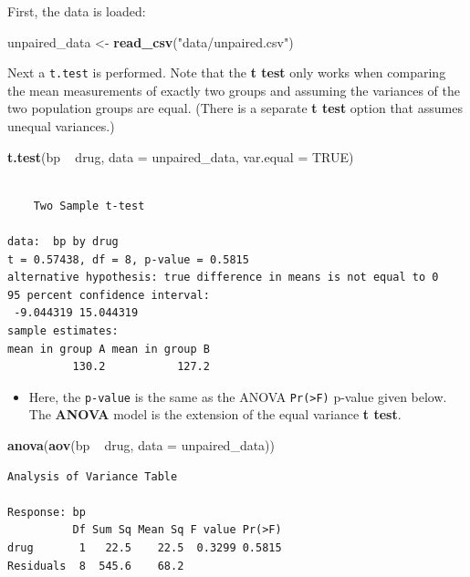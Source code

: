 \documentclass[twoside, 12pt]{article}
\newenvironment{Shaded}{\begin{snugshade}}{\end{snugshade}}
\newcommand{\KeywordTok}[1]{\textcolor[rgb]{0.13,0.29,0.53}{\textbf{{#1}}}}
\newcommand{\DataTypeTok}[1]{\textcolor[rgb]{0.13,0.29,0.53}{{#1}}}
\newcommand{\StringTok}[1]{\textcolor[rgb]{0.31,0.60,0.02}{{#1}}}
\newcommand{\OtherTok}[1]{\textcolor[rgb]{0.56,0.35,0.01}{{#1}}}
\newcommand{\NormalTok}[1]{{#1}}
\providecommand{\tightlist}{%
  \setlength{\itemsep}{0pt}\setlength{\parskip}{0pt}}
\begin{document}
First, the data is loaded:

\begin{Shaded}
\begin{Highlighting}[]
\NormalTok{unpaired_data <-}\StringTok{ }\KeywordTok{read_csv}\NormalTok{(}\StringTok{"data/unpaired.csv"}\NormalTok{)}
\end{Highlighting}
\end{Shaded}

Next a \texttt{t.test} is performed. Note that the \textbf{t test} only
works when comparing the mean measurements of exactly two groups and
assuming the variances of the two population groups are equal. (There is
a separate \textbf{t test} option that assumes unequal variances.)

\begin{Shaded}
\begin{Highlighting}[]
\KeywordTok{t.test}\NormalTok{(bp ~}\StringTok{ }\NormalTok{drug, }\DataTypeTok{data =} \NormalTok{unpaired_data, }\DataTypeTok{var.equal =} \OtherTok{TRUE}\NormalTok{)}
\end{Highlighting}
\end{Shaded}

\begin{Verbatim}[frame=single]

    Two Sample t-test

data:  bp by drug
t = 0.57438, df = 8, p-value = 0.5815
alternative hypothesis: true difference in means is not equal to 0
95 percent confidence interval:
 -9.044319 15.044319
sample estimates:
mean in group A mean in group B 
          130.2           127.2 
\end{Verbatim}

\begin{itemize}
\tightlist
\item
  Here, the \texttt{p-value} is the same as the ANOVA
  \texttt{Pr(\textgreater{}F)} p-value given below. The \textbf{ANOVA}
  model is the extension of the equal variance \textbf{t test}.
\end{itemize}

\begin{Shaded}
\begin{Highlighting}[]
\KeywordTok{anova}\NormalTok{(}\KeywordTok{aov}\NormalTok{(bp ~}\StringTok{ }\NormalTok{drug, }\DataTypeTok{data =} \NormalTok{unpaired_data))}
\end{Highlighting}
\end{Shaded}

\begin{Verbatim}[frame=single]
Analysis of Variance Table

Response: bp
          Df Sum Sq Mean Sq F value Pr(>F)
drug       1   22.5    22.5  0.3299 0.5815
Residuals  8  545.6    68.2               
\end{Verbatim}
\end{document}
